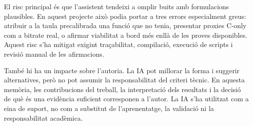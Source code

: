El risc principal és que l'assistent tendeixi a omplir buits amb formulacions
plausibles. En aquest projecte això podia portar a tres errors especialment
greus: atribuir a la taula precalibrada una funció que no tenia, presentar
proxies C-only com a bitrate real, o afirmar viabilitat a bord més enllà de les
proves disponibles. Aquest risc s'ha mitigat exigint traçabilitat, compilació,
execució de scripts i revisió manual de les afirmacions.

També hi ha un impacte sobre l'autoria. La IA pot millorar la forma i suggerir
alternatives, però no pot assumir la responsabilitat del criteri tècnic. En
aquesta memòria, les contribucions del treball, la interpretació dels resultats
i la decisió de què és una evidència suficient corresponen a l'autor. La IA s'ha
utilitzat com a eina de suport, no com a substitut de l'aprenentatge, la
validació ni la responsabilitat acadèmica.
